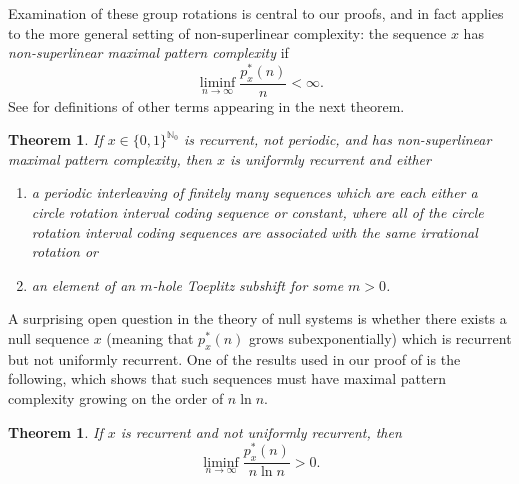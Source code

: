 \documentclass[11pt,reqno]{amsart}
\newtheorem{question}[theorem]{Question}
\theoremstyle{definition}
\theoremstyle{plain}
\newcounter{MainTheoremCounter}
\newtheorem{Maintheorem}[MainTheoremCounter]{Theorem}
\newcommand{\N}{\mathbb{N}}
\newcommand{\AuthornoteA}[2]{{\sf\small\color{magenta}{[#1: #2]}}}
\newcommand{\Anote}{\AuthornoteA{A}}
\begin{document}

Examination of these group rotations is central to our proofs, and in fact applies to the more general setting of non-superlinear  complexity: the sequence $x$ has \emph{non-superlinear maximal pattern complexity} if 
\[
    \liminf_{n \to \infty} \frac{p_x^*(n)}{n} < \infty.
\]
See  for definitions of other terms appearing in the next theorem.

\begin{Maintheorem}\label{mainthm:non-superlinear}
If $x \in \{0, 1\}^{\N_0}$ is recurrent, not periodic, and has non-superlinear maximal pattern complexity, then $x$ is uniformly recurrent and either
\begin{enumerate}
    \item a periodic interleaving of finitely many sequences which are each either a circle rotation interval coding sequence or constant, where all of the circle rotation interval coding sequences are associated with the same irrational rotation or
    \item an element of an $m$-hole Toeplitz subshift for some $m > 0$. 
\end{enumerate}
\end{Maintheorem}

A surprising open question in the theory of null systems is whether there exists a null sequence $x$ (meaning that $p^*_x(n)$ grows subexponentially) which is recurrent but not uniformly recurrent. One of the results used in our proof of  is the following, which shows that such sequences must have maximal pattern complexity growing on the order of $n \ln n$.

\begin{Maintheorem}\label{mainthm:recnotmin}
If $x$ is recurrent and not uniformly recurrent, then 
\[
\liminf_{n \to \infty} \frac{p^*_x(n)}{n \ln n} > 0.
\]
\end{Maintheorem}



\end{document}
